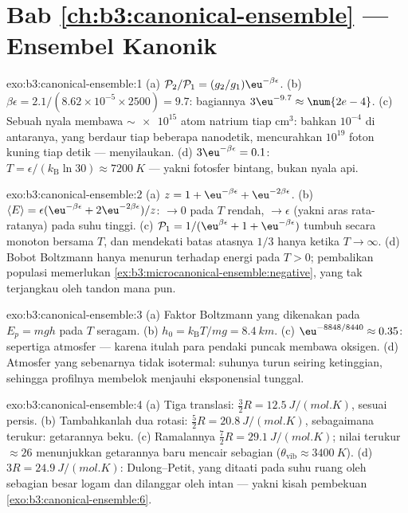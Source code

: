 \section*{Bab \ref{ch:b3:canonical-ensemble} --- Ensembel Kanonik}

\begin{solution}{exo:b3:canonical-ensemble:1}
(a) $\mathcal P_2/\mathcal P_1 = (g_2/g_1)\eu^{-\beta\epsilon}$.
(b) $\beta\epsilon = 2.1/(8.62\times10^{-5} \times 2500) = 9.7$:
bagiannya $3\eu^{-9.7} \approx \num{2e-4}$. (c) Sebuah nyala membawa
$\sim\num{e15}$ atom natrium tiap cm$^3$: bahkan $10^{-4}$ di antaranya,
yang berdaur tiap beberapa nanodetik, mencurahkan $10^{19}$ foton kuning
tiap detik --- menyilaukan. (d) $3\eu^{-\beta\epsilon} = 0.1$:
$T = \epsilon/(k_{\text{B}}\ln30) \approx \qty{7200}{K}$ --- yakni
fotosfer bintang, bukan nyala api.
\end{solution}

\begin{solution}{exo:b3:canonical-ensemble:2}
(a) $z = 1 + \eu^{-\beta\epsilon} + \eu^{-2\beta\epsilon}$. (b)
$\langle E\rangle = \epsilon(\eu^{-\beta\epsilon} +
2\eu^{-2\beta\epsilon})/z$: $\to 0$ pada $T$ rendah, $\to \epsilon$
(yakni aras rata-ratanya) pada suhu tinggi. (c) $\mathcal P_1 = 1/(\eu^{\beta
\epsilon} + 1 + \eu^{-\beta\epsilon})$ tumbuh secara monoton bersama
$T$, dan mendekati batas atasnya $1/3$ hanya ketika $T \to \infty$. (d)
Bobot Boltzmann hanya menurun terhadap energi pada $T > 0$; pembalikan
populasi memerlukan 
\cref{ex:b3:microcanonical-ensemble:negative}, yang tak terjangkau oleh
tandon mana pun.
\end{solution}

\begin{solution}{exo:b3:canonical-ensemble:3}
(a) Faktor Boltzmann yang dikenakan pada $E_p = mgh$ pada $T$ seragam. (b) $h_0 =
k_{\text{B}}T/mg = \qty{8.4}{km}$. (c) $\eu^{-8848/8440} \approx
0.35$: sepertiga atmosfer --- karena itulah para pendaki puncak membawa
oksigen. (d) Atmosfer yang sebenarnya tidak isotermal: suhunya turun
seiring ketinggian, sehingga profilnya membelok menjauhi eksponensial
tunggal.
\end{solution}

\begin{solution}{exo:b3:canonical-ensemble:4}
(a) Tiga translasi: $\tfrac32 R = \qty{12.5}{J/(mol.K)}$, sesuai
persis. (b) Tambahkanlah dua rotasi: $\tfrac52 R =
\qty{20.8}{J/(mol.K)}$, sebagaimana terukur: getarannya beku. (c)
Ramalannya $\tfrac72 R = \qty{29.1}{J/(mol.K)}$; nilai terukur
$\approx26$ menunjukkan getarannya baru mencair sebagian ($\theta_{\text{vib}}
\approx \qty{3400}{K}$). (d) $3R = \qty{24.9}{J/(mol.K)}$:
Dulong--Petit, yang ditaati pada suhu ruang oleh sebagian besar logam
dan dilanggar oleh intan --- yakni kisah pembekuan
\cref{exo:b3:canonical-ensemble:6}.
\end{solution}

